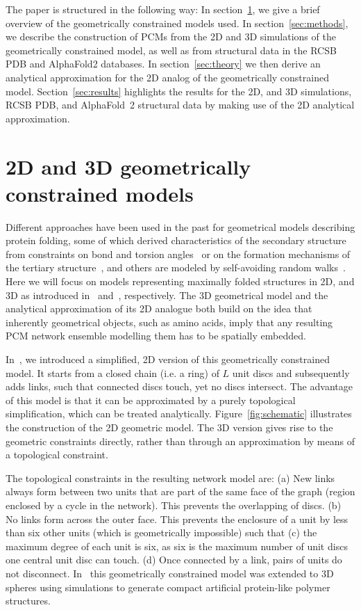 \documentclass[10pt]{iopart}
\begin{document}
The paper is structured in the following way: In section~\ref{sec:models}, we give a brief overview of the geometrically constrained models used. In section~\ref{sec:methods}, we describe the construction of PCMs from the 2D and 3D simulations of the geometrically constrained model, as well as from structural data in the RCSB PDB and AlphaFold2 databases. In section~\ref{sec:theory} we then derive an analytical approximation for the 2D analog of the geometrically constrained model. Section~\ref{sec:results} highlights the results for the 2D, and 3D simulations, RCSB PDB, and AlphaFold~2 structural data by making use of the 2D analytical approximation.
\section{2D and 3D geometrically constrained models}
\label{sec:models}
Different approaches have been used in the past for geometrical models describing protein folding, some of which derived characteristics of the secondary structure from constraints on bond and torsion angles~\cite{bhattacharjee2013flory, Danielsson2010, Molkenthin2011} or on the formation mechanisms of the tertiary structure~\cite{molkenthin2016scaling, molkenthin2020self}, and others are modeled by self-avoiding random walks~\cite{mey2014rareevent, hills2009insights}. Here we will focus on models representing maximally folded structures in 2D, and 3D as introduced in~\cite{molkenthin2016scaling} and~\cite{molkenthin2020self}, respectively. The 3D geometrical model and the analytical approximation of its 2D analogue both build on the idea that inherently geometrical objects, such as amino acids, imply that any resulting PCM network ensemble modelling them has to be spatially embedded. 

In~\cite{molkenthin2016scaling}, we introduced a simplified, 2D version of this geometrically constrained model. It starts from a closed chain (i.e. a ring) of $L$ unit discs and subsequently adds links, such that connected discs touch, yet no discs intersect. The advantage of this model is that it can be approximated by a purely topological simplification, which can be treated analytically. Figure~\ref{fig:schematic} illustrates the construction of the 2D geometric model. The 3D version gives rise to the geometric constraints directly, rather than through an approximation by means of a topological constraint.

The topological constraints in the resulting network model are:
(a) New links always form between two units that are part of the same face of the graph (region enclosed by a cycle in the network). This prevents the overlapping of discs. (b) No links form across the outer face. This prevents the enclosure of a unit by less than six other units (which is geometrically impossible) such that (c) the maximum degree of each unit is six, as six is the maximum number of unit discs one central unit disc can touch. (d) Once connected by a link, pairs of units do not disconnect. In~\cite{molkenthin2020self} this geometrically constrained model was extended to 3D spheres using simulations to generate compact artificial protein-like polymer structures. 
\end{document}
